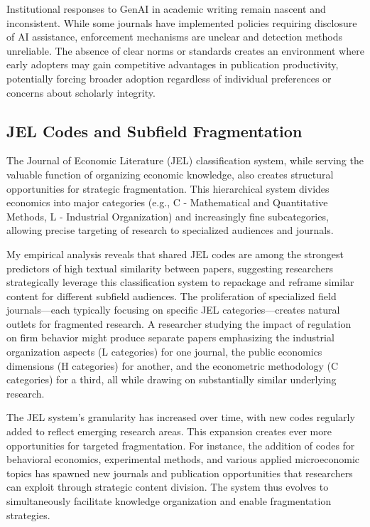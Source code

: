 \documentclass[12pt]{article}
\begin{document}
Institutional responses to GenAI in academic writing remain nascent and inconsistent. While some journals have implemented policies requiring disclosure of AI assistance, enforcement mechanisms are unclear and detection methods unreliable. The absence of clear norms or standards creates an environment where early adopters may gain competitive advantages in publication productivity, potentially forcing broader adoption regardless of individual preferences or concerns about scholarly integrity.

\subsection{JEL Codes and Subfield Fragmentation}

The Journal of Economic Literature (JEL) classification system, while serving the valuable function of organizing economic knowledge, also creates structural opportunities for strategic fragmentation. This hierarchical system divides economics into major categories (e.g., C - Mathematical and Quantitative Methods, L - Industrial Organization) and increasingly fine subcategories, allowing precise targeting of research to specialized audiences and journals.

My empirical analysis reveals that shared JEL codes are among the strongest predictors of high textual similarity between papers, suggesting researchers strategically leverage this classification system to repackage and reframe similar content for different subfield audiences. The proliferation of specialized field journals—each typically focusing on specific JEL categories—creates natural outlets for fragmented research. A researcher studying the impact of regulation on firm behavior might produce separate papers emphasizing the industrial organization aspects (L categories) for one journal, the public economics dimensions (H categories) for another, and the econometric methodology (C categories) for a third, all while drawing on substantially similar underlying research.

The JEL system's granularity has increased over time, with new codes regularly added to reflect emerging research areas. This expansion creates ever more opportunities for targeted fragmentation. For instance, the addition of codes for behavioral economics, experimental methods, and various applied microeconomic topics has spawned new journals and publication opportunities that researchers can exploit through strategic content division. The system thus evolves to simultaneously facilitate knowledge organization and enable fragmentation strategies.
\end{document}

